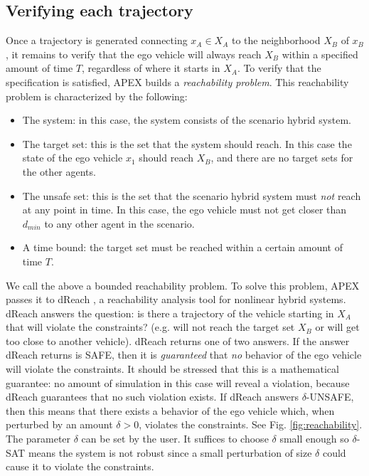 \subsection{Verifying each trajectory}
\label{sec:verif each traj}
Once a trajectory is generated connecting $x_A \in X_A$ to the neighborhood $X_B$ of $x_B$, it remains to verify that the ego vehicle will always reach $X_B$ within a specified amount of time $T$, regardless of where it starts in $X_A$.
To verify that the specification is satisfied, APEX builds a \emph{reachability problem}.
This reachability problem is characterized by the following:
\begin{itemize}
	\item The system: in this case, the system consists of the scenario hybrid system.
	\item The target set: this is the set that the system should reach. 
	In this case the state of the ego vehicle $x_1$ should reach $X_B$, and there are no target sets for the other agents. 
	\item The unsafe set: this is the set that the scenario hybrid system must \emph{not} reach at any point in time.
	In this case, the ego vehicle must not get closer than $d_{min}$ to any other agent in the scenario.
	\item A time bound: the target set must be reached within a certain amount of time $T$.
\end{itemize}

We call the above a bounded reachability problem. %
To solve this problem, APEX passes it to dReach \cite{KongGCC15}, a reachability analysis tool for nonlinear hybrid systems.
dReach answers the question: is there a trajectory of the vehicle starting in $X_A$ that will violate the constraints? (e.g. will not reach the target set $X_B$ or will get too close to another vehicle).
dReach returns one of two answers.
If the answer dReach returns is SAFE, then it is \emph{guaranteed} that \emph{no} behavior of the ego vehicle will violate the constraints.
It should be stressed that this is a mathematical guarantee: no amount of simulation in this case will reveal a violation, because dReach guarantees that no such violation exists.
If dReach answers $\delta$-UNSAFE, then this means that there exists a behavior of the ego vehicle which, when perturbed by an amount $\delta >0$, violates the constraints.
See Fig. \ref{fig:reachability}.
The parameter $\delta$ can be set by the user.
It suffices to choose $\delta$ small enough so $\delta$-SAT means the system is not robust since a small perturbation of size $\delta$ could cause it to violate the constraints.

